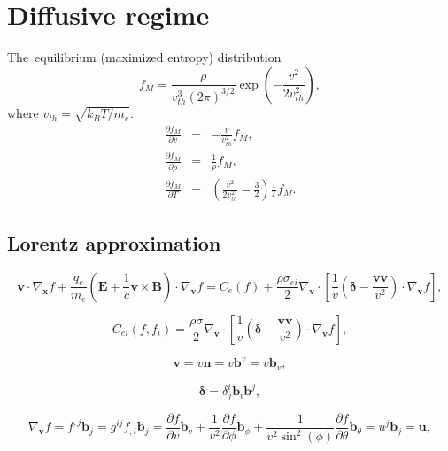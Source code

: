 \documentclass[preprint,12pt]{elsarticle}
\newcommand{\pdv}[2]{\frac{\partial{#1}}{\partial{#2}}}
\newcommand{\vect}[1]{\boldsymbol{#1}}
\newcommand{\matr}[1]{\mathbf{#1}}
\newcommand{\vmag}{v}
\newcommand{\vth}{v_{th}}
\newcommand{\vn}{\vect{n}}
\newcommand{\E}{\vect{E}}
\newcommand{\B}{\vect{B}}
\newcommand{\qe}{q_e}
\newcommand{\me}{m_e}
\newcommand{\kB}{k_B}
\newcommand{\fM}{f_M}
\newcounter{bla}
\begin{document}
\section{Diffusive regime}
The~equilibrium (maximized entropy) distribution
\begin{equation}
  \fM = \frac{\rho}{\vth^3 \left( 2 \pi \right)^{3/2}} 
  \exp\left(- \frac{\vmag^2}{2 \vth^2} \right) ,
  \label{eq:MBdistribution}
\end{equation}
where $\vth = \sqrt{\kB T/\me}$.
\begin{eqnarray}
  \pdv{\fM}{\vmag} &=& -\frac{\vmag}{\vth^2}\fM ,
  \nonumber \\
  \pdv{\fM}{\rho} &=& \frac{1}{\rho}\fM ,
  \nonumber \\
  \pdv{\fM}{T} &=& \left( \frac{\vmag^2}{2 \vth^2} - \frac{3}{2}\right)
  \frac{1}{T}\fM. 
  \nonumber
\end{eqnarray}

\subsection{Lorentz approximation}\label{sec:Lorentz_cop}
\begin{equation}
  \vect{v}\cdot\nabla_{\vect{x}} f 
  + \frac{\qe}{\me}\left(\E + \frac{1}{c}\vect{v}\times\B\right)\cdot
  \nabla_{\vect{v}}f = 
  C_e(f)
  + \frac{\rho\sigma_{ei}}{2}\nabla_{\vect{v}}\cdot
  \left[\frac{1}{\vmag}
  \left(\matr{\delta} - \frac{\vect{v}\vect{v}}{\vmag^2} \right)\cdot
  \nabla_{\vect{v}} f\right] ,
  \label{eq:Lorentz}
\end{equation}

\begin{equation}
  C_{ei}(f, f_i) = 
  \frac{\rho\sigma}{2}\nabla_{\vect{v}}\cdot
  \left[\frac{1}{\vmag}
  \left(\matr{\delta} - \frac{\vect{v}\vect{v}}{\vmag^2} \right)\cdot
  \nabla_{\vect{v}} f\right] ,
  \label{eq:ei_collision_operator}
\end{equation}

\begin{equation}
  \vect{v} = \vmag\vn = \vmag\vect{b}^\vmag = \vmag\vect{b}_\vmag ,
  \label{eq:v}
\end{equation}

\begin{equation}
  \matr{\delta} = \delta^i_j \vect{b}_i \vect{b}^j ,
  \label{eq:delta}
\end{equation}

\begin{equation}
  \nabla_{\vect{v}} f = f^{,j}\vect{b}_j = g^{ij} f_{,i}\vect{b}_j 
  = \pdv{f}{\vmag}\vect{b}_\vmag + \frac{1}{\vmag^2}\pdv{f}{\phi}\vect{b}_\phi
  + \frac{1}{\vmag^2\sin^2(\phi)}\pdv{f}{\theta}\vect{b}_{\theta} 
  = u^j\vect{b}_j = \vect{u} ,
  \nonumber
\end{equation}
\end{document}
